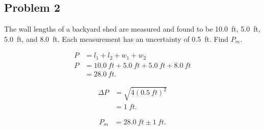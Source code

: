 
\subsection{Problem 2}

The wall lengths of a backyard shed are measured and found to be \SI{10.0}{ft}, \SI{5.0}{ft}, \SI{5.0}{ft}, and \SI{8.0}{ft}. Each measurement has an uncertainty of \SI{0.5}{ft}. Find $P_{m}$.

\begin{align*}
	P &= l_1 + l_2 + w_1 + w_2 \\
	P &= \SI{10.0}{ft} + \SI{5.0}{ft} + \SI{5.0}{ft} + \SI{8.0}{ft} \\
	&= \SI{28.0}{ft}
	.\end{align*}

\begin{align*}
	\Delta P &= \sqrt{4\left( \SI{0.5}{ft} \right)^2} \\
	&= \SI{1}{ft}
	.\end{align*}

\begin{align*}
	P_{m} &= \SI{28.0}{ft} \pm \SI{1}{ft}
	.\end{align*}
